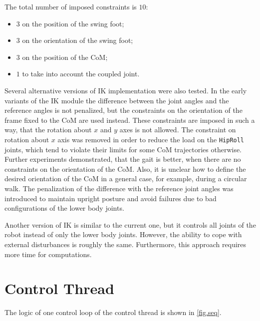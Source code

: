 The total number of imposed constraints is $10$:
\begin{itemize}
    \item $3$ on the position of the swing foot;
    \item $3$ on the orientation of the swing foot;
    \item $3$ on the position of the \ac{CoM};
    \item $1$ to take into account the coupled joint.
\end{itemize}

Several alternative versions of \ac{IK} implementation were also tested. In the early 
variants of the \ac{IK} module the difference between the joint angles and the reference 
angles is not penalized, but the constraints on the orientation of the frame fixed to 
the \ac{CoM} are used instead. These constraints are imposed in such a way, that the 
rotation about $x$ and $y$ axes is not allowed. The constraint on rotation about $x$ 
axis was removed in order to reduce the load on the \verb|HipRoll| joints, which tend 
to violate their limits for some \ac{CoM} trajectories otherwise. Further experiments 
demonstrated, that the gait is better, when there are no constraints on the orientation 
of the \ac{CoM}. Also, it is unclear how to define the desired orientation of the \ac{CoM} 
in a general case, for example, during a circular walk. The penalization of the 
difference with the reference joint angles was introduced to maintain upright posture
and avoid failures due to bad configurations of the lower body joints.

Another version of \ac{IK} is similar to the current one, but it controls all joints of 
the robot instead of only the lower body joints. However, the ability to cope with external 
disturbances is roughly the same. Furthermore, this approach requires more time for 
computations.




\section{Control Thread}
The logic of one control loop of the control thread is shown in \cref{fig.seq}. 

